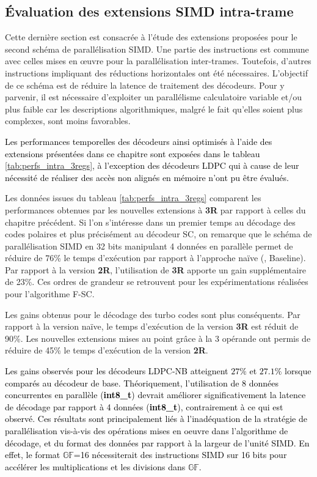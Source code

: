 \documentclass[../main.tex]{subfiles}
\begin{document}
\subsection{Évaluation des extensions SIMD intra-trame}
%
%
%
Cette dernière section est consacrée à l'étude des extensions proposées pour le second schéma de parallélisation SIMD. 
Une partie des instructions est commune avec celles mises en œuvre pour la parallélisation inter-trames. 
Toutefois, d'autres instructions impliquant des réductions horizontales ont été nécessaires. L'objectif de ce schéma est de réduire la latence de traitement des décodeurs. 
Pour y parvenir, il est nécessaire d'exploiter un parallélisme calculatoire variable et/ou plus faible car les descriptions algorithmiques, malgré le fait qu'elles soient plus complexes, sont moins favorables.

\textcolor{black}{Les performances temporelles des décodeurs ainsi optimisés à l'aide des extensions présentées dans ce chapitre sont exposées dans le tableau \ref{tab:perfs_intra_3regs}, à l'exception des décodeurs LDPC qui à cause de leur nécessité de réaliser des accès non alignés en mémoire n'ont pu être évalués.}

Les données issues du tableau \ref{tab:perfs_intra_3regs} comparent les performances obtenues par les nouvelles extensions à \textbf{3R} par rapport à celles du chapitre précédent.
Si l'on s'intéresse dans un premier temps au décodage des codes polaires et plus précisément au décodeur SC, on remarque que le schéma de parallélisation SIMD en 32 bits manipulant 4 données en parallèle permet de réduire de 76\% le temps d'exécution par rapport à l'approche naïve (, Baseline).
Par rapport à la version \textbf{2R}, l'utilisation de \textbf{3R} apporte un gain supplémentaire de 23\%.
Ces ordres de grandeur se retrouvent pour les expérimentations réalisées pour l'algorithme F-SC.

Les gains obtenus pour le décodage des turbo codes sont plus conséquents. Par rapport à la version naïve, le temps d'exécution de la version \textbf{3R} est réduit de 90\%.
Les nouvelles extensions mises au point grâce à la 3 opérande ont permis de réduire de 45\% le temps d'exécution de la version \textbf{2R}.

\textcolor{black}{Les gains observés pour les décodeurs LDPC-NB atteignent $27\%$ et $27.1\%$ lorsque comparés au décodeur de base. Théoriquement, l'utilisation de 8 données concurrentes en parallèle (\textbf{int8\_t}) devrait améliorer significativement la latence de décodage par rapport à 4 données (\textbf{int8\_t}), contrairement à ce qui est observé.
Ces résultats sont principalement liés à l'inadéquation de la stratégie de parallélisation vis-à-vis des opérations mises en oeuvre dans l'algorithme de décodage, et du format des données par rapport à la largeur de l'unité SIMD.
En effet, le format $\mathbb{GF}$=16 nécessiterait des instructions SIMD sur 16 bits pour accélérer les multiplications et les divisions dans $\mathbb{GF}$.}
\end{document}
